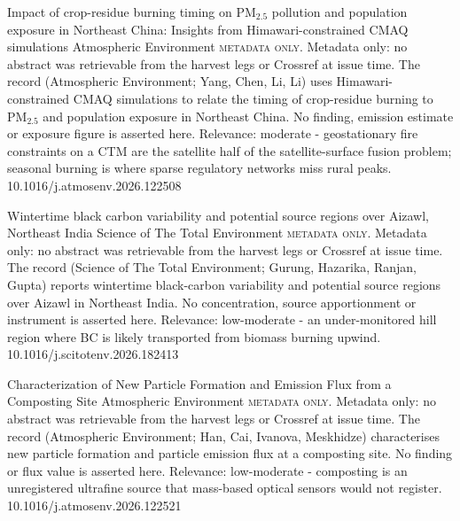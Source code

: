 \documentclass[10pt]{article}
\begin{document}
{Impact of crop-residue burning timing on PM$_{2.5}$ pollution and population exposure in Northeast China: Insights from Himawari-constrained CMAQ simulations}
{Atmospheric Environment}
{\textsc{metadata only.} Metadata only: no abstract was retrievable from the harvest legs or Crossref at issue time. The record (Atmospheric Environment; Yang, Chen, Li, Li) uses Himawari-constrained CMAQ simulations to relate the timing of crop-residue burning to PM$_{2.5}$ and population exposure in Northeast China. No finding, emission estimate or exposure figure is asserted here. Relevance: moderate - geostationary fire constraints on a CTM are the satellite half of the satellite-surface fusion problem; seasonal burning is where sparse regulatory networks miss rural peaks.}
{10.1016/j.atmosenv.2026.122508}

{Wintertime black carbon variability and potential source regions over Aizawl, Northeast India}
{Science of The Total Environment}
{\textsc{metadata only.} Metadata only: no abstract was retrievable from the harvest legs or Crossref at issue time. The record (Science of The Total Environment; Gurung, Hazarika, Ranjan, Gupta) reports wintertime black-carbon variability and potential source regions over Aizawl in Northeast India. No concentration, source apportionment or instrument is asserted here. Relevance: low-moderate - an under-monitored hill region where BC is likely transported from biomass burning upwind.}
{10.1016/j.scitotenv.2026.182413}

{Characterization of New Particle Formation and Emission Flux from a Composting Site}
{Atmospheric Environment}
{\textsc{metadata only.} Metadata only: no abstract was retrievable from the harvest legs or Crossref at issue time. The record (Atmospheric Environment; Han, Cai, Ivanova, Meskhidze) characterises new particle formation and particle emission flux at a composting site. No finding or flux value is asserted here. Relevance: low-moderate - composting is an unregistered ultrafine source that mass-based optical sensors would not register.}
{10.1016/j.atmosenv.2026.122521}

\par{}\baselineskip{}\baselineskip
{}
\end{document}
